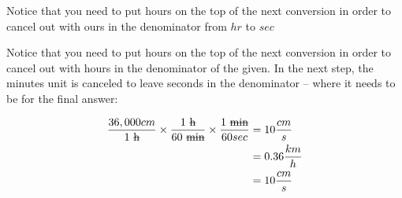 \begin{example}
	Notice that you need to put hours on the top of the next conversion in order
	to cancel out with ours in the denominator from $hr$ to $sec$

	Notice that you need to put hours on the top of the next conversion in order
	to cancel out with hours in the denominator of the given. In the next step,
	the minutes unit is canceled to leave seconds in the denominator -- where it
	needs to be for the final answer:

	\begin{align}
		\frac{36,000 cm}{1 \rm{ \sout{h}}} \times \frac{1 \rm{ \sout{h}}}{60 \rm{ \sout{min}}} \times \frac{1 \rm{ \sout{min}}}{60 sec} &= 10 \frac{cm}{s} \\
		                                                                                                                                &= 0.36 \frac{km}{h} \\
		                                                                                                                                &= 10 \frac{cm}{s}
	\end{align}
\end{example}


